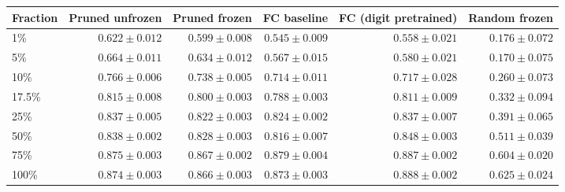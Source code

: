 \begin{tabular}{lrrrrr}
\toprule
Fraction & Pruned unfrozen & Pruned frozen & FC baseline & FC (digit pretrained) & Random frozen \\
\midrule
1\%   & $0.622 \pm 0.012$ & $0.599 \pm 0.008$ & $0.545 \pm 0.009$ & $0.558 \pm 0.021$ & $0.176 \pm 0.072$ \\
5\%   & $0.664 \pm 0.011$ & $0.634 \pm 0.012$ & $0.567 \pm 0.015$ & $0.580 \pm 0.021$ & $0.170 \pm 0.075$ \\
10\%  & $0.766 \pm 0.006$ & $0.738 \pm 0.005$ & $0.714 \pm 0.011$ & $0.717 \pm 0.028$ & $0.260 \pm 0.073$ \\
17.5\% & $0.815 \pm 0.008$ & $0.800 \pm 0.003$ & $0.788 \pm 0.003$ & $0.811 \pm 0.009$ & $0.332 \pm 0.094$ \\
25\%  & $0.837 \pm 0.005$ & $0.822 \pm 0.003$ & $0.824 \pm 0.002$ & $0.837 \pm 0.007$ & $0.391 \pm 0.065$ \\
50\%  & $0.838 \pm 0.002$ & $0.828 \pm 0.003$ & $0.816 \pm 0.007$ & $0.848 \pm 0.003$ & $0.511 \pm 0.039$ \\
75\%  & $0.875 \pm 0.003$ & $0.867 \pm 0.002$ & $0.879 \pm 0.004$ & $0.887 \pm 0.002$ & $0.604 \pm 0.020$ \\
100\% & $0.874 \pm 0.003$ & $0.866 \pm 0.003$ & $0.873 \pm 0.003$ & $0.888 \pm 0.002$ & $0.625 \pm 0.024$ \\
\bottomrule
\end{tabular}
